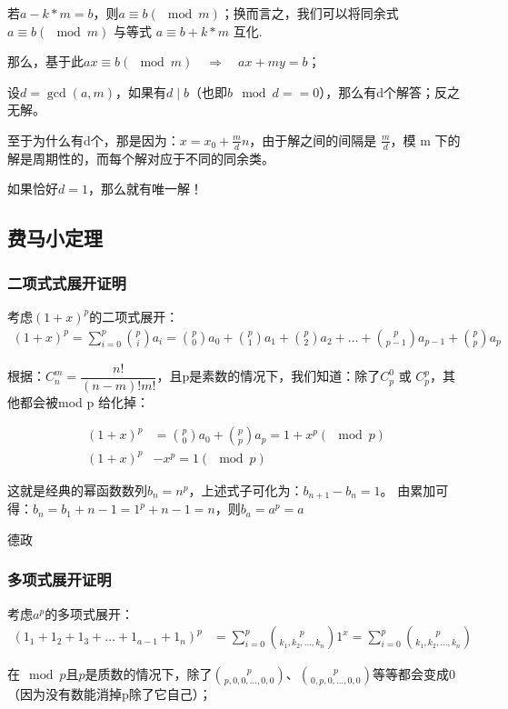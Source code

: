 \documentclass[12pt]{article}
\begin{document}
若$a-k*m=b$，则$a\equiv b(\mod m)$；换而言之，我们可以将同余式 $a\equiv b(\mod m)$ 与等式 $a\equiv b+k*m$ 互化.

那么，基于此$ax\equiv b(\mod m) \quad \Rightarrow \quad ax+my=b$；

设$d=\gcd(a,m)$，如果有$d \mid b$（也即$b\mod d == 0$），那么有d个解答；反之无解。

至于为什么有d个，那是因为：$x=x_{0}+\frac{m}{d}n$，由于解之间的间隔是 $\frac{m}{d}$，模 
m 下的解是周期性的，而每个解对应于不同的同余类。

如果恰好$d=1$，那么就有唯一解！

\subsection{费马小定理}

\subsubsection{二项式式展开证明}
考虑$(1+x)^{p}$的二项式展开：
\begin{align*}
    (1+x)^{p} = \sum_{i=0}^{p}\binom{p}{i}a_{i} = \binom{p}{0}a_{0} + \binom{p}{1}a_{1} + \binom{p}{2}a_{2} + \dots + \binom{p}{p-1}a_{p-1} + \binom{p}{p}a_{p}
\end{align*}

根据：$C_{n}^m=\dfrac{n!}{(n-m)!m!}$，且p是素数的情况下，我们知道：除了$C_{p}^{0}$ 或 $C_{p}^{p}$，其他都会被mod p 给化掉：

\begin{align*}
    (1+x)^{p} &= \binom{p}{0}a_{0} + \binom{p}{p}a_{p} = 1+x^{p} (\mod p)\\ 
    (1+x)^{p} &- x^{p} = 1 (\mod p)
\end{align*}

这就是经典的幂函数数列$b_{n}=n^{p}$，上述式子可化为：$b_{n+1}-b_{n}=1$。
由累加可得：$b_{n}=b_{1}+n-1=1^{p}+n-1=n$，则$b_{a}=a^{p}=a$

德政

\subsubsection{多项式展开证明}
考虑$a^{p}$的多项式展开：
\begin{align*}
    (1_{1}+1_{2}+1_{3}+\dots+1_{a-1}+1_{n})^{p}&=\sum_{i=0}^p\binom{p}{k_{1},k_{2},\dots,k_{n}}1^{x}=\sum_{i=0}^p\binom{p}{k_{1},k_{2},\dots,k_{n}}
\end{align*}

在$\mod p$且$p$是质数的情况下，除了$\binom{p}{p,0,0,\dots,0,0}$、$\binom{p}{0,p,0,\dots,0,0}$等等都会变成0（因为没有数能消掉p除了它自己）；
\end{document}
